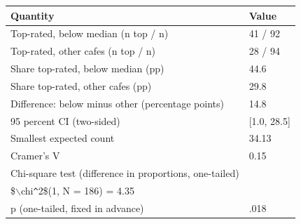 \begin{table}[ht]
\centering
\begingroup\footnotesize
\begin{tabular}{ll}
  \toprule
Quantity & Value \\ 
  \midrule
Top-rated, below median (n top / n) & 41 / 92 \\ 
  Top-rated, other cafes (n top / n) & 28 / 94 \\ 
  Share top-rated, below median (pp) & 44.6 \\ 
  Share top-rated, other cafes (pp) & 29.8 \\ 
  Difference: below minus other (percentage points) & 14.8 \\ 
  95 percent CI (two-sided) & [1.0, 28.5] \\ 
  Smallest expected count & 34.13 \\ 
  Cramer's V & 0.15 \\ 
  Chi-square test (difference in proportions, one-tailed) &  \\ 
  \$$\backslash$chi\verb|^|2\$(1, N = 186) = 4.35 &  \\ 
  p (one-tailed, fixed in advance) & .018 \\ 
   \bottomrule
\end{tabular}
\endgroup
\end{table}
